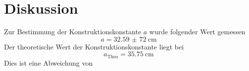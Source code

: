 \section{Diskussion}
Zur Bestimmung der Konstruktionskonstante $a$ wurde
folgender Wert gemessen
\begin{equation*}
    a = \SI{32,59(72)}{\centi\meter}
\end{equation*}
Der theoretische Wert der Konstruktionskonstante liegt bei 
\begin{equation*}
   a_{\text{Theo}} = \SI{35.75}{\centi\meter}
\end{equation*}
Dies ist eine Abweichung von
